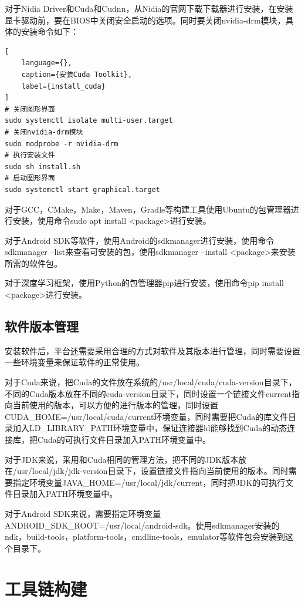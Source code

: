 对于Nidia Driver和Cuda和Cudnn，从Nidia的官网下载下载器进行安装，在安装显卡驱动前，要在BIOS中关闭安全启动的选项。同时要关闭nvidia-drm模块，具体的安装命令如下：

\begin{lstlisting}[
    language={},
    caption={安装Cuda Toolkit},
    label={install_cuda}
]
# 关闭图形界面
sudo systemctl isolate multi-user.target
# 关闭nvidia-drm模块
sudo modprobe -r nvidia-drm
# 执行安装文件
sudo sh install.sh
# 启动图形界面
sudo systemctl start graphical.target
\end{lstlisting}

对于GCC，CMake，Make，Maven，Gradle等构建工具使用Ubuntu的包管理器进行安装，使用命令sudo apt install <package>进行安装。

对于Android SDK等软件，使用Android的sdkmanager进行安装，使用命令sdkmanager --list来查看可安装的包，使用sdkmanager --install <package>来安装所需的软件包。

对于深度学习框架，使用Python的包管理器pip进行安装，使用命令pip install <package>进行安装。


\subsection{软件版本管理}

安装软件后，平台还需要采用合理的方式对软件及其版本进行管理，同时需要设置一些环境变量来保证软件的正常使用。

对于Cuda来说，把Cuda的文件放在系统的/usr/local/cuda/cuda-version目录下，不同的Cuda版本放在不同的cuda-version目录下，同时设置一个链接文件current指向当前使用的版本，可以方便的进行版本的管理，同时设置CUDA\_HOME=/usr/local/cuda/current环境变量，同时需要把Cuda的库文件目录加入LD\_LIBRARY\_PATH环境变量中，保证连接器ld能够找到Cuda的动态连接库，把Cuda的可执行文件目录加入PATH环境变量中。

对于JDK来说，采用和Cuda相同的管理方法，把不同的JDK版本放在/usr/local/jdk/jdk-version目录下，设置链接文件指向当前使用的版本。同时需要指定环境变量JAVA\_HOME=/usr/local/jdk/current，同时把JDK的可执行文件目录加入PATH环境变量中。

对于Android SDK来说，需要指定环境变量ANDROID\_SDK\_ROOT=/usr/local/android-sdk。使用sdkmanager安装的ndk，build-tools，platform-tools，cmdline-tools，emulator等软件包会安装到这个目录下。


\section{工具链构建}

